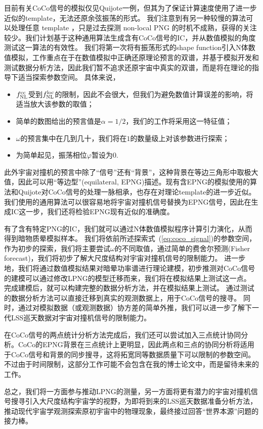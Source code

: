目前有关CoCo信号的模拟仅见Quijote一例\cite{goldstein2024quijotecc}，但其为了保证计算速度使用了进一步近似的template，无法还原余弦振荡的形式。
我们注意到有另一种较慢的算法可以处理任意 template \cite{wagner2010pshmf,regan2012uningic}，只是过去探测 non-local PNG 的时机不成熟，获得的关注较少。我们计划基于这种通用算法生成含有CoCo信号的IC，并从数值模拟的角度测试这一算法的有效性。
我们将第一次将有振荡形式的shape function引入N体数值模拟，工作重点在于在数值模拟中正确还原理论预言的双谱，并基于模拟开发和测试数据分析方法，因此我们暂不追求还原宇宙中真实的双谱，而是将在理论的指导下适当探索参数空间。
具体来说，
\begin{itemize}
    \item $f_{\rm NL}^{\rm cc}$受到$f_{\rm NL}^{\rm loc}$的限制，因此不会很大，但我们为避免数值计算误差的影响，将适当放大该参数的取值；
    \item 简单的数图给出的预言值是$\alpha=1/2$，我们的工作将采用这一特征值；
    \item $\omega$的预言集中在几到几十，我们将在$1$的数量级上对该参数进行探索；
    \item 为简单起见，振荡相位$\varphi$暂设为$0$.
\end{itemize}

此外宇宙对撞机的预言中除了“信号”还有“背景”\cite{arkani-hamed2015coco}，这种背景在等边三角形中取极大值，因此可以用“等边型”(equilateral, EPNG)描述。现有含EPNG的模拟使用的算法和Quijote对CoCo信号的处理一脉相承，也存在对理论template的进一步近似\cite{scoccimarro2012nonlocalpng}。我们使用的通用算法可以很容易地将宇宙对撞机信号替换为EPNG信号，因此在生成IC这一步，我们还将检验EPNG现有近似的准确度。

有了含有特定PNG的IC，我们就可以通过N体数值模拟程序计算引力演化，从而得到暗物质晕模拟样本。
我们将依前所述探索式~(\ref{eq:coco_signal})的参数空间，作为初步的探索，我们将主要尝试$\omega$的不同取值，通过简单的费舍尔预测(Fisher forecast)，我们将初步了解大尺度结构对宇宙对撞机信号的限制能力。
进一步地，我们将通过数值模拟结果对暗晕功率谱进行理论建模，初步推测对CoCo信号的建模可以通过修改LPNG的模型迁移而来，我们将在模拟结果上测试这一点。
完成建模后，就可以构建完整的数据分析方法，并在模拟结果上测试。
通过测试的数据分析方法可以直接迁移到真实的观测数据上，用于CoCo信号的搜寻。
同时，通过对模拟数据（或观测数据）协方差的简单外推，我们可以进一步了解下一代LSS巡天数据对宇宙对撞机信号的限制能力。

在CoCo信号的两点统计分析方法完成后，我们还可以尝试加入三点统计协同分析。CoCo的EPNG背景在三点统计上更明显，因此两点和三点的协同分析将适用于CoCo信号和背景的同步搜寻，这将拓宽同等数据质量下可以限制的参数空间。不过由于时间限制，这部分工作可能不会包含在我的博士论文中，而是留待未来的工作。

总之，我们将一方面参与推动LPNG的测量，另一方面将更有潜力的宇宙对撞机信号搜寻引入大尺度结构宇宙学的视野，为即将到来的LSS巡天数据准备分析方法，推动现代宇宙学观测探索原初宇宙中的物理现象，最终接过回答“世界本源”问题的接力棒。